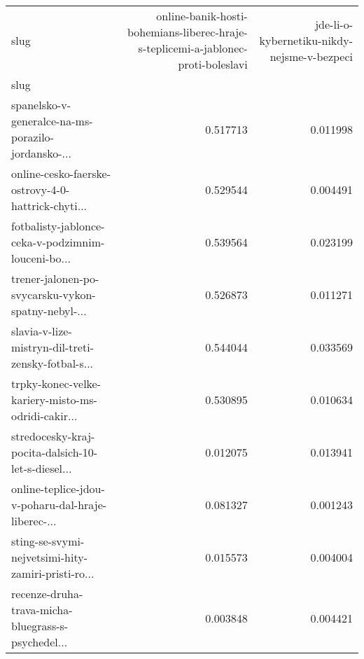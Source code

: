 \begin{tabular}{lrr}
\toprule
slug &  online-banik-hosti-bohemians-liberec-hraje-s-teplicemi-a-jablonec-proti-boleslavi &  jde-li-o-kybernetiku-nikdy-nejsme-v-bezpeci \\
slug                                               &                                                                                    &                                              \\
\midrule
spanelsko-v-generalce-na-ms-porazilo-jordansko-... &                                           0.517713 &                                     0.011998 \\
online-cesko-faerske-ostrovy-4-0-hattrick-chyti... &                                           0.529544 &                                     0.004491 \\
fotbalisty-jablonce-ceka-v-podzimnim-louceni-bo... &                                           0.539564 &                                     0.023199 \\
trener-jalonen-po-svycarsku-vykon-spatny-nebyl-... &                                           0.526873 &                                     0.011271 \\
slavia-v-lize-mistryn-dil-treti-zensky-fotbal-s... &                                           0.544044 &                                     0.033569 \\
trpky-konec-velke-kariery-misto-ms-odridi-cakir... &                                           0.530895 &                                     0.010634 \\
stredocesky-kraj-pocita-dalsich-10-let-s-diesel... &                                           0.012075 &                                     0.013941 \\
online-teplice-jdou-v-poharu-dal-hraje-liberec-... &                                           0.081327 &                                     0.001243 \\
sting-se-svymi-nejvetsimi-hity-zamiri-pristi-ro... &                                           0.015573 &                                     0.004004 \\
recenze-druha-trava-micha-bluegrass-s-psychedel... &                                           0.003848 &                                     0.004421 \\
\bottomrule
\end{tabular}

